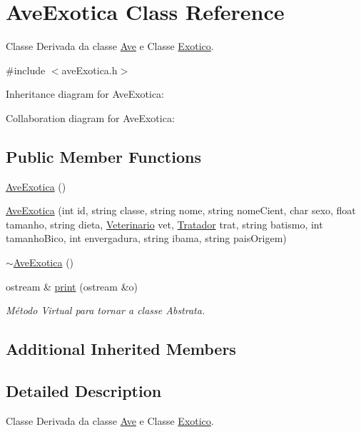 \hypertarget{classAveExotica}{}\section{Ave\+Exotica Class Reference}
\label{classAveExotica}


Classe Derivada da classe \hyperlink{classAve}{Ave} e Classe \hyperlink{classExotico}{Exotico}.  




{\ttfamily \#include $<$ave\+Exotica.\+h$>$}



Inheritance diagram for Ave\+Exotica\+:


Collaboration diagram for Ave\+Exotica\+:
\subsection*{Public Member Functions}
\begin{DoxyCompactItemize}
\item 
\hyperlink{classAveExotica_ac4e60b460604816c67a66218e93f3b7f}{Ave\+Exotica} ()
\item 
\hyperlink{classAveExotica_a7fb0dcfbd5dfb25a62b27610583d7245}{Ave\+Exotica} (int id, string classe, string nome, string nome\+Cient, char sexo, float tamanho, string dieta, \hyperlink{classVeterinario}{Veterinario} vet, \hyperlink{classTratador}{Tratador} trat, string batismo, int tamanho\+Bico, int envergadura, string ibama, string pais\+Origem)
\item 
\hyperlink{classAveExotica_a548f328d5fe687e37f96936f0024845e}{$\sim$\+Ave\+Exotica} ()
\item 
ostream \& \hyperlink{classAveExotica_abe7b82c5cd14eefb532db19069fc9fcf}{print} (ostream \&o)
\begin{DoxyCompactList}\small\item\em Método Virtual para tornar a classe Abstrata. \end{DoxyCompactList}\end{DoxyCompactItemize}
\subsection*{Additional Inherited Members}


\subsection{Detailed Description}
Classe Derivada da classe \hyperlink{classAve}{Ave} e Classe \hyperlink{classExotico}{Exotico}. 

